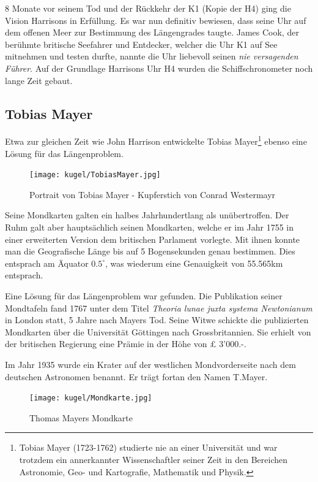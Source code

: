 \begin{refsection}
8 Monate vor seinem Tod und der Rückkehr der K1 (Kopie der H4) ging die Vision Harrisons in Erfüllung. Es war nun definitiv bewiesen, dass seine Uhr auf dem offenen Meer zur Bestimmung des Längengrades taugte. James Cook, der berühmte britische Seefahrer und Entdecker, welcher die Uhr K1 auf See mitnehmen und testen durfte, nannte die Uhr liebevoll seinen \textit{nie versagenden Führer}.
Auf der Grundlage Harrisons Uhr H4 wurden die Schiffschronometer noch lange Zeit gebaut.



\subsection{Tobias Mayer}
Etwa zur gleichen Zeit wie John Harrison entwickelte Tobias Mayer\footnote{%
Tobias Mayer (1723-1762) studierte nie an einer Universität und war trotzdem ein annerkannter Wissenschaftler seiner Zeit in den Bereichen Astronomie, Geo- und Kartografie, Mathematik und Physik.}
ebenso eine Lösung für das Längenproblem.

\begin{figure}[htbp]
\centering
\texttt{[image: kugel/TobiasMayer.jpg]}
\caption{Portrait von Tobias Mayer - Kupferstich von Conrad Westermayr}
\end{figure}

Seine Mondkarten galten ein halbes Jahrhundertlang als unübertroffen. Der Ruhm galt aber hauptsächlich seinen Mondkarten, welche er im Jahr 1755 in einer erweiterten Version dem britischen Parlament vorlegte.
Mit ihnen konnte man die Geografische Länge bis auf 5 Bogensekunden genau bestimmen. Dies entsprach am Äquator $0.5 ^{\circ}$, was wiederum eine Genauigkeit von 55.565km entsprach.

Eine Lösung für das Längenproblem war gefunden. Die Publikation seiner Mondtafeln fand 1767 unter dem Titel \textit{Theoria lunae juxta systema Newtonianum} in London statt, 5 Jahre nach Mayers Tod. 
Seine Witwe schickte die publizierten Mondkarten über die Universität Göttingen nach Grossbritannien. Sie erhielt von der britischen Regierung eine Prämie in der Höhe von £ 3’000.-.

Im Jahr 1935 wurde ein Krater auf der westlichen Mondvorderseite nach dem deutschen Astronomen benannt. Er trägt fortan den Namen T.Mayer.

\begin{figure}[htbp]
\centering
\texttt{[image: kugel/Mondkarte.jpg]}
\caption{Thomas Mayers Mondkarte}
\end{figure}




\end{refsection}
